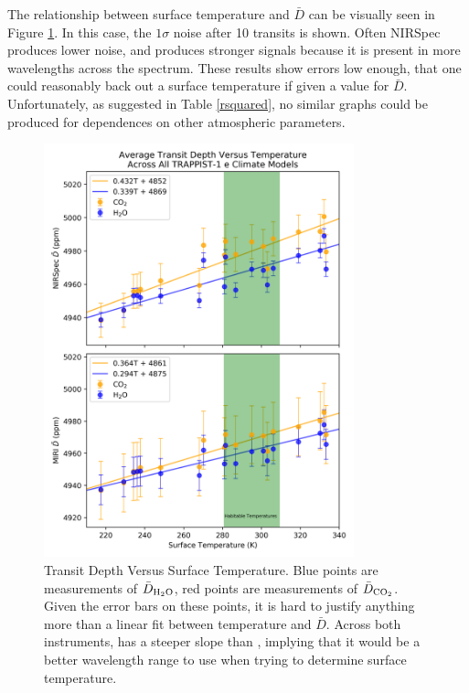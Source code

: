 The relationship between surface temperature and $\bar{D}$ can be visually seen
 in Figure \ref{depthfromtemp}. In this case, the $1\sigma$ noise after 10
 transits is shown. Often NIRSpec produces lower noise, and  produces
 stronger signals because it is present in more wavelengths across the spectrum.
 These results show errors low enough, that one could reasonably back out a
 surface temperature if given a value for $\bar{D}$.
 Unfortunately, as suggested in Table \ref{rsquared}, no similar graphs could
 be produced for dependences on other atmospheric parameters.

\begin{figure}[ht]
    \includegraphics[width=0.8\textwidth]{./spectra/depth_from_temp.png}
    \caption[Transit Depth Versus Surface Temperature]{Transit Depth Versus
    Surface Temperature. Blue points are measurements of
    $\bar{D}_{\mathrm{H_2O}}$, red points are measurements of $\bar{D}_{\mathrm{CO_2}}$.
    Given the error bars on these points, it is hard to justify anything more
    than a linear fit between temperature and $\bar{D}$. Across both
    instruments,  has a steeper slope than , implying that
    it would be a better wavelength range to use when trying to determine
    surface temperature.}
    \label{depthfromtemp}
\end{figure}

